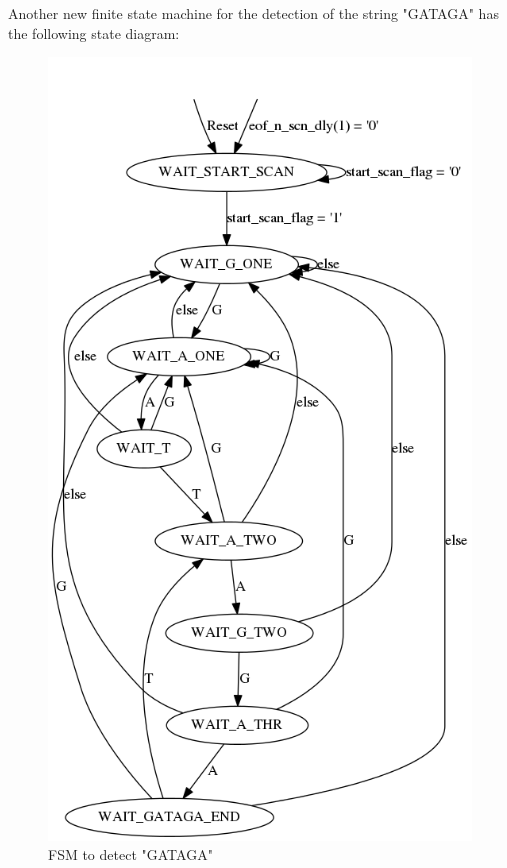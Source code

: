 \documentclass{article}
\begin{document}
Another new finite state machine for the detection of the string "GATAGA" has the following state diagram:
	\begin{figure}[h]
		\begin{center}
			\includegraphics[scale=0.35]{../graphviz/part_3_state_diagram_GATAGA.png}
			\caption{FSM to detect "GATAGA"}
		\end{center}
	\end{figure}
\end{document}
